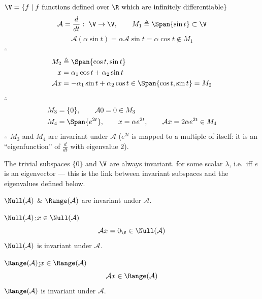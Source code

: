 \begin{example}
$\V=\{f\mid f\text{ functions defined over }\R\text{ which are infinitely differentiable}\}$
\[
\mathcal{A}=\frac{d}{dt}:\ \V\to\V, \qquad M_1\triangleq\Span\{\sin t\}\subset\V
\]
\[
\mathcal{A}(\alpha\sin t)=\alpha\mathcal{A}\sin t=\alpha\cos t\notin M_1
\]
$\therefore$ 
\begin{align*}
M_2&\triangleq\Span\{\cos t,\sin t\}\\
x&=\alpha_1\cos t+\alpha_2\sin t\\
\mathcal{A}x&=-\alpha_1\sin t+\alpha_2\cos t\in\Span\{\cos t,\sin t\}= M_2
\end{align*}
$\therefore$ 
\begin{align*}
M_3&=\{0\}, \qquad \mathcal{A}0=0\in M_3\\
M_4&=\Span\{e^{2t}\},\qquad x=\alpha e^{2t},\qquad \mathcal{A}x=2\alpha e^{2t}\in M_4
\end{align*}
$\therefore$ $M_3$ and $M_4$ are invariant under $\mathcal{A}$ ($e^{2t}$ is mapped to a multiple of itself: it is an ``eigenfunction'' of $\frac{d}{dt}$ with eigenvalue $2$).
\end{example}
\begin{insight}
The trivial subspaces $\{0\}$ and $\V$ are always invariant.  for some scalar $\lambda$, i.e.\ iff $e$ is an eigenvector --- this is the link between invariant subspaces and the eigenvalues defined below.
\end{insight}

\begin{example}
$\Null(\mathcal{A})$ \& $\Range(\mathcal{A})$ are invariant under $\mathcal{A}$.

\begin{minipage}[t]{0.48\textwidth}
\underline{$\Null(\mathcal{A})$:}\quad $x\in\Null(\mathcal{A})$
\[
\mathcal{A}x=0_{\V}\in\Null(\mathcal{A})
\]
$\Null(\mathcal{A})$ is invariant under $\mathcal{A}$.
\end{minipage}\hfill
\begin{minipage}[t]{0.48\textwidth}
\underline{$\Range(\mathcal{A})$:}\quad $x\in\Range(\mathcal{A})$
\[
\mathcal{A}x\in\Range(\mathcal{A})
\]
$\Range(\mathcal{A})$ is invariant under $\mathcal{A}$.
\end{minipage}
\end{example}

